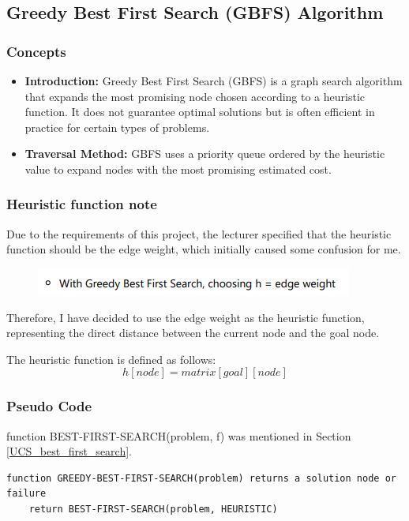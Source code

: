 \subsection{Greedy Best First Search (GBFS) Algorithm }
\subsubsection*{Concepts}
\begin{itemize}
    \item \textbf{Introduction:} Greedy Best First Search (GBFS) is a graph search algorithm that expands the most promising node chosen according to a heuristic function. It does not guarantee optimal solutions but is often efficient in practice for certain types of problems.
    \item \textbf{Traversal Method:} GBFS uses a priority queue ordered by the heuristic value to expand nodes with the most promising estimated cost.
\end{itemize}
\subsubsection{Heuristic function note}

Due to the requirements of this project, the lecturer specified that the heuristic function should be the edge weight, which initially caused some confusion for me.

\begin{figure}[h]
\centering
\includegraphics[]{Greedy_requirement.PNG}
\label{fig:Greedy_requirement}
\end{figure}

Therefore, I have decided to use the edge weight as the heuristic function, representing the direct distance between the current node and the goal node.

The heuristic function is defined as follows:
\[h[node] = matrix[goal][node]\]


\subsubsection*{Pseudo Code}
function BEST-FIRST-SEARCH(problem, f) was mentioned in Section \ref{UCS_best_first_search}.
\begin{verbatim}
function GREEDY-BEST-FIRST-SEARCH(problem) returns a solution node or failure
    return BEST-FIRST-SEARCH(problem, HEURISTIC)

\end{verbatim}

